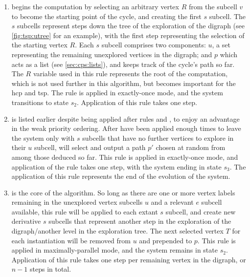 \begin{enumerate}
    \item {} begins the computation by selecting an arbitrary vertex \(R\) from the subcell \(v\) to become the starting point of the cycle, and creating the first \(s\) subcell.  The \(s\) subcells represent steps down the tree of the exploration of the digraph (see \cref{fig:tsp:utree} for an example), with the first step representing the selection of the starting vertex \(R\).  Each \(s\) subcell comprises two components: \(u\), a set representing the remaining unexplored vertices in the digraph; and \(p\) which acts as a list (see \cref{sec:cps:lists}), and keeps track of the cycle's path so far.  The \(R\) variable used in this rule represents the root of the computation, which is not used further in this algorithm, but becomes important for the \gls{hcp} and \gls{tsp}.  The rule is applied in exactly-once mode, and the system transitions to state \(s_2\).  Application of this rule takes one step.
    \item {} is listed earlier despite being applied after rules  and , to enjoy an advantage in the weak priority ordering.  After  have been applied enough times to leave the system only with \(s\) subcells that have no further vertices to explore in their \(u\) subcell,  will select and output a path \(p'\) chosen at random from among those deduced so far.  This rule is applied in exactly-once mode, and application of the rule takes one step, with the system ending in state \(s_3\).  The application of this rule represents the end of the evolution of the system.
    \item {} is the core of the algorithm.  So long as there are one or more vertex labels remaining in the unexplored vertex subcells \(u\) and a relevant \(e\) subcell available, this rule will be applied to each extant \(s\) subcell, and create new derivative \(s\) subcells that represent another step in the exploration of the digraph/another level in the exploration tree.  The next selected vertex \(T\) for each instantiation will be removed from \(u\) and prepended to \(p\).  This rule is applied in maximally-parallel mode, and the system remains in state \(s_2\).  Application of this rule takes one step per remaining vertex in the digraph, or \(n - 1\) steps in total.

\end{enumerate}
